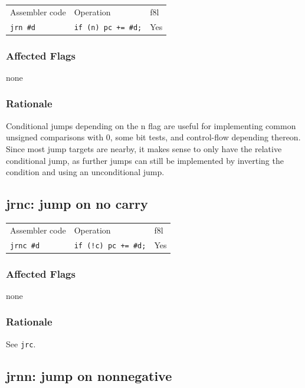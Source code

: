 \documentclass{book}
\begin{document}
\begin{tabular}{l l l}
Assembler code   & Operation                  & f8l \\
\texttt{jrn \#d} & \texttt{if (n) pc += \#d;} & Yes \\
\end{tabular}

\subsubsection*{Affected Flags}

none

\subsubsection*{Rationale}

Conditional jumps depending on the n flag are useful for implementing common unsigned comparisons with 0, some bit tests, and control-flow depending thereon. Since most jump targets are nearby, it makes sense to only have the relative conditional jump, as further jumps can still be implemented by inverting the condition and using an unconditional jump.


\subsection{jrnc: jump on no carry}

\begin{tabular}{l l l}
Assembler code    & Operation                    & f8l \\
\texttt{jrnc \#d} & \texttt{if (!c) pc += \#d;} & Yes \\
\end{tabular}

\subsubsection*{Affected Flags}

none

\subsubsection*{Rationale}

See \texttt{jrc}.


\subsection{jrnn: jump on nonnegative}
\end{document}
